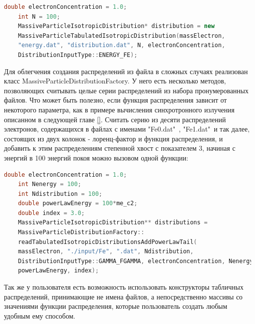 \begin{lstlisting}[language=c++]
	double electronConcentration = 1.0;
	int N = 100;
	MassiveParticleIsotropicDistribution* distribution = new
	MassiveParticleTabulatedIsotropicDistribution(massElectron,
	"energy.dat", "distribution.dat", N, electronConcentration,
	DistributionInputType::ENERGY_FE);
\end{lstlisting}

Для облегчения создания распределений из файла в сложных случаях реализован класс MassiveParticleDistributionFactory. У него есть несколько методов, позволяющих считывать целые серии распределений из набора пронумерованных файлов. Что может быть полезно, если функция распределения зависит от некоторого параметра, как в примере вычисления синхротронного излучения описанном в следующей главе \ref{}. Считать серию из десяти распределений электронов, содержащихся в файлах с именами  "Fe0.dat"\ , "Fe1.dat"\  и так далее, состоящих из двух колонок - лоренц-фактор и функция распределения, и добавить к этим распределениям степенной хвост с показателем 3, начиная с энергий в 100 энергий покоя можно вызовом одной функции: 

\begin{lstlisting}[language=c++]
	double electronConcentration = 1.0;
	int Nenergy = 100;
	int Ndistribution = 100;
	double powerLawEnergy = 100*me_c2;
	double index = 3.0;
	MassiveParticleIsotropicDistribution** distributions = 
	MassiveParticleDistributionFactory::
	readTabulatedIsotropicDistributionsAddPowerLawTail(
	massElectron, "./input/Fe", ".dat", Ndistribution, 
	DistributionInputType::GAMMA_FGAMMA, electronConcentration, Nenergy,
	powerLawEnergy, index);
\end{lstlisting}

Так же у пользователя есть возможность использовать конструкторы табличных распределений, принимающие не имена файлов, а непосредственно массивы со значениями функции распределения, которые пользователь создать любым удобным ему способом.

